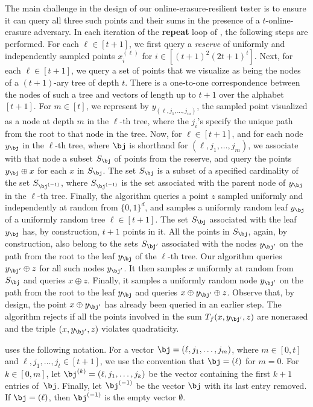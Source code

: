 \documentclass{toc}
\begin{document}
The main challenge in the design of our online-erasure-resilient tester is to ensure it can  query all three such points and their sums in the presence of a $t$-online-erasure adversary. In each iteration of the \textbf{repeat} loop of , the following steps are performed. 
For each $\ell \in [t+1]$, we first query a \emph{reserve} of uniformly and independently sampled points  $x_i^{(\ell)}$ for $i \in [(t+1)^2(2t+1)^t]$. 
Next, for each $\ell \in [t+1]$, we query a set of points that we visualize as being the nodes of a $(t+1)$-ary tree of depth $t$. 
There is a one-to-one correspondence between the nodes of such a tree and vectors of length up to $t + 1$ over the alphabet $[t+1]$.
For $m \in [t]$, we represent by $y_{(\ell,j_1,\dots,j_m)}$, the sampled point visualized as a node at depth $m$ in the $\ell$-th tree, where the $j_i$'s specify the unique path from the root to that node in the tree.
Now, for $\ell \in [t+1]$, and for each node $y_{\bj}$ in the $\ell$-th tree, where $\bj$ is shorthand for $(\ell,j_1,\dots,j_m)$, we associate with that node a subset $S_{\bj}$ of points from the reserve, and query the points $y_{\bj} \oplus x$ for each $x$ in $S_{\bj}$. The set $S_{\bj}$ is a subset of a specified cardinality of the set $S_{\bj^{(-1)}}$, where $S_{\bj^{(-1)}}$ is the set associated with the parent node of $y_{\bj}$ in the $\ell$-th tree.
Finally, the algorithm queries a point $z$ sampled uniformly and independently at random from $\{0,1\}^d$, and samples a uniformly random leaf $y_{\bj}$ of a uniformly random tree $\ell \in [t+1]$. 
The set $S_{\bj}$ associated with the leaf $y_{\bj}$ has, by construction, $t+1$ points in it. 
All the points in $S_{\bj}$, again, by construction, also belong to the sets $S_{\bj'}$ associated with the nodes $y_{\bj'}$ on the path from the root to the leaf $y_{\bj}$ of the $\ell$-th tree. 
Our algorithm queries $y_{\bj'}\oplus z$ for all such nodes $y_{\bj'}$.
It then samples $x$ uniformly at random from $S_{\bj}$ and queries $x \oplus z$. Finally, it samples a uniformly random node $y_{\bj'}$ on the path from the root to the leaf $y_{\bj}$ and queries $x \oplus y_{\bj'} \oplus z$.
Observe that, by design, the point $x \oplus y_{\bj'}$ has already been queried in an earlier step.
The algorithm rejects if all the points
involved in the sum $T_f(x, y_{\bj'}, z)$  are nonerased and the triple $(x, y_{\bj'}, z)$ violates quadraticity.



 uses the following notation.
For a vector $\bj = (\ell, j_1, \dots, j_m)$, where $m \in [0,t]$ and $\ell, j_1, \dots, j_t \in [t+1]$, we use the convention that $\bj = (\ell)$ for $m=0$. For $ k \in[0,m]$, let $\bj^{(k)} = (\ell, j_1, \dots, j_k)$ be the vector containing the first $k+1$ entries of~$\bj$. Finally, let $\bj^{(-1)}$ be the vector $\bj$ with its last entry removed. If $\bj = (\ell)$, then $\bj^{(-1)}$ is the empty vector $\emptyset$.
\end{document}

